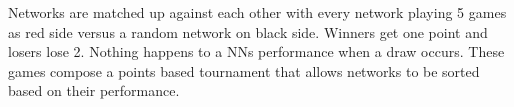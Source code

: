\documentclass{article}
\begin{document}
Networks are matched up against each other with
every network playing 5 games as red side versus a random network on black
side. Winners get one point and losers lose 2. Nothing happens to a NNs
performance when a draw occurs. These games compose a points based tournament
that allows networks to be sorted based on their performance.
\end{document}
